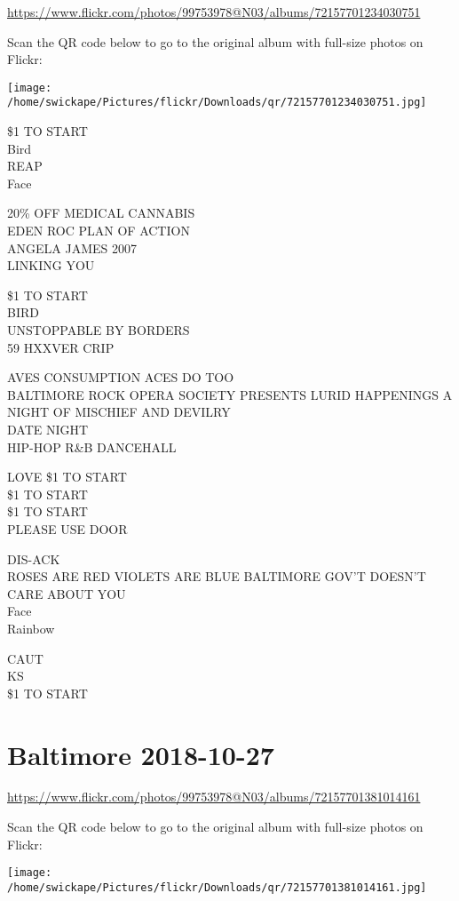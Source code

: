 \documentclass[10pt,letterpaper]{article}
\begin{document}
\url{https://www.flickr.com/photos/99753978@N03/albums/72157701234030751}

Scan the QR code below to go to the original album with full-size photos on Flickr:

\texttt{[image: /home/swickape/Pictures/flickr/Downloads/qr/72157701234030751.jpg]}


\$1 TO START\\
Bird\\
REAP\\
Face

20\% OFF MEDICAL CANNABIS\\
EDEN ROC PLAN OF ACTION\\
ANGELA JAMES 2007\\
LINKING YOU

\$1 TO START\\
BIRD\\
UNSTOPPABLE BY BORDERS\\
59 HXXVER CRIP

AVES CONSUMPTION ACES DO TOO\\
BALTIMORE ROCK OPERA SOCIETY PRESENTS LURID HAPPENINGS A NIGHT OF MISCHIEF AND DEVILRY\\
DATE NIGHT\\
HIP{-}HOP R\&B DANCEHALL

LOVE \$1 TO START\\
\$1 TO START\\
\$1 TO START\\
PLEASE USE DOOR

DIS{-}ACK\\
ROSES ARE RED VIOLETS ARE BLUE BALTIMORE GOV'T DOESN'T CARE ABOUT YOU\\
Face\\
Rainbow

CAUT\\
KS\\
\$1 TO START


\section*{Baltimore 2018-10-27}

\url{https://www.flickr.com/photos/99753978@N03/albums/72157701381014161}

Scan the QR code below to go to the original album with full-size photos on Flickr:

\texttt{[image: /home/swickape/Pictures/flickr/Downloads/qr/72157701381014161.jpg]}
\end{document}
